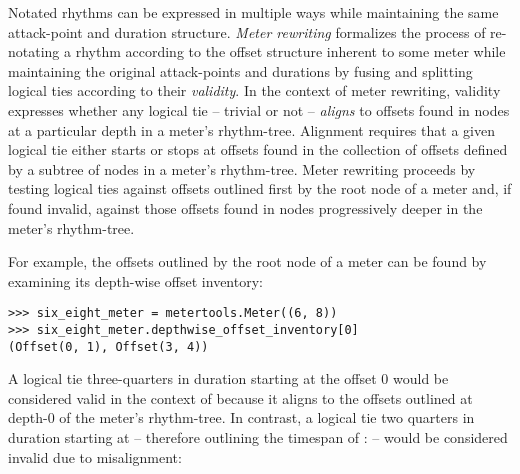 
Notated rhythms can be expressed in multiple ways while maintaining the same
attack-point and duration structure. \emph{Meter rewriting} formalizes the
process of re-notating a rhythm according to the offset structure inherent to
some meter while maintaining the original attack-points and durations by fusing
and splitting logical ties according to their \emph{validity}. In the context
of meter rewriting, validity expresses whether any logical tie -- trivial or
not -- \emph{aligns} to offsets found in nodes at a particular depth in a
meter's rhythm-tree. Alignment requires that a given logical tie either starts
or stops at offsets found in the collection of offsets defined by a subtree of
nodes in a meter's rhythm-tree. Meter rewriting proceeds by testing logical
ties against offsets outlined first by the root node of a meter and, if found
invalid, against those offsets found in nodes progressively deeper in the
meter's rhythm-tree.

For example, the offsets outlined by the root node of a  meter can
be found by examining its depth-wise offset inventory:

\begin{comment}
<abjad>
six_eight_meter = metertools.Meter((6, 8))
six_eight_meter.depthwise_offset_inventory[0]
</abjad>
\end{comment}

\begin{abjadbookoutput}
\begin{singlespacing}
\vspace{-0.5\baselineskip}
\begin{verbatim}
>>> six_eight_meter = metertools.Meter((6, 8))
>>> six_eight_meter.depthwise_offset_inventory[0]
(Offset(0, 1), Offset(3, 4))
\end{verbatim}
\end{singlespacing}
\end{abjadbookoutput}

\noindent A logical tie three-quarters in duration starting at the offset 0
would be considered valid in the context of  because it aligns to
the offsets outlined at depth-0 of the meter's rhythm-tree. In contrast, a
logical tie two quarters in duration starting at  -- therefore
outlining the timespan of : -- would be considered
invalid due to misalignment:

